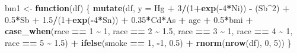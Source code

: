 \documentclass[12pt, twoside]{amherstthesis}
\newenvironment{Shaded}{\begin{snugshade}}{\end{snugshade}}
\newcommand{\AttributeTok}[1]{\textcolor[rgb]{0.13,0.29,0.53}{#1}}
\newcommand{\ControlFlowTok}[1]{\textcolor[rgb]{0.13,0.29,0.53}{\textbf{#1}}}
\newcommand{\DecValTok}[1]{\textcolor[rgb]{0.00,0.00,0.81}{#1}}
\newcommand{\FloatTok}[1]{\textcolor[rgb]{0.00,0.00,0.81}{#1}}
\newcommand{\FunctionTok}[1]{\textcolor[rgb]{0.13,0.29,0.53}{\textbf{#1}}}
\newcommand{\NormalTok}[1]{#1}
\newcommand{\OtherTok}[1]{\textcolor[rgb]{0.56,0.35,0.01}{#1}}
\newcommand{\SpecialCharTok}[1]{\textcolor[rgb]{0.81,0.36,0.00}{\textbf{#1}}}
\begin{document}
\begin{Shaded}
\begin{Highlighting}[]
\NormalTok{bm1 }\OtherTok{\textless{}{-}} \ControlFlowTok{function}\NormalTok{(df) \{}
  \FunctionTok{mutate}\NormalTok{(df, }\AttributeTok{y =} 
\NormalTok{           Hg }\SpecialCharTok{+} \DecValTok{3}\SpecialCharTok{/}\NormalTok{(}\DecValTok{1}\SpecialCharTok{+}\FunctionTok{exp}\NormalTok{(}\SpecialCharTok{{-}}\DecValTok{4}\SpecialCharTok{*}\NormalTok{Ni)) }\SpecialCharTok{{-}}\NormalTok{ (Sb}\SpecialCharTok{\^{}}\DecValTok{2}\NormalTok{) }\SpecialCharTok{+} \FloatTok{0.5}\SpecialCharTok{*}\NormalTok{Sb }\SpecialCharTok{+} \FloatTok{1.5}\SpecialCharTok{/}\NormalTok{(}\DecValTok{1}\SpecialCharTok{+}\FunctionTok{exp}\NormalTok{(}\SpecialCharTok{{-}}\DecValTok{4}\SpecialCharTok{*}\NormalTok{Sn)) }\SpecialCharTok{+} 
           \FloatTok{0.35}\SpecialCharTok{*}\NormalTok{Cd}\SpecialCharTok{*}\NormalTok{As }\SpecialCharTok{+} 
\NormalTok{           age }\SpecialCharTok{+} \FloatTok{0.5}\SpecialCharTok{*}\NormalTok{bmi }\SpecialCharTok{+} 
           \FunctionTok{case\_when}\NormalTok{(race }\SpecialCharTok{==} \DecValTok{1} \SpecialCharTok{\textasciitilde{}} \DecValTok{1}\NormalTok{, }
\NormalTok{                     race }\SpecialCharTok{==} \DecValTok{2} \SpecialCharTok{\textasciitilde{}} \FloatTok{1.5}\NormalTok{, }
\NormalTok{                     race }\SpecialCharTok{==} \DecValTok{3} \SpecialCharTok{\textasciitilde{}} \DecValTok{1}\NormalTok{, }
\NormalTok{                     race }\SpecialCharTok{==} \DecValTok{4} \SpecialCharTok{\textasciitilde{}} \DecValTok{1}\NormalTok{, }
\NormalTok{                     race }\SpecialCharTok{==} \DecValTok{5} \SpecialCharTok{\textasciitilde{}} \FloatTok{1.5}\NormalTok{) }\SpecialCharTok{+}
           \FunctionTok{ifelse}\NormalTok{(smoke }\SpecialCharTok{==} \DecValTok{1}\NormalTok{, }\SpecialCharTok{{-}}\DecValTok{1}\NormalTok{, }\FloatTok{0.5}\NormalTok{) }\SpecialCharTok{+}
           \FunctionTok{rnorm}\NormalTok{(}\FunctionTok{nrow}\NormalTok{(df), }\DecValTok{0}\NormalTok{, }\DecValTok{5}\NormalTok{))}
\NormalTok{\}}


\end{Highlighting}
\end{Shaded}
\end{document}
